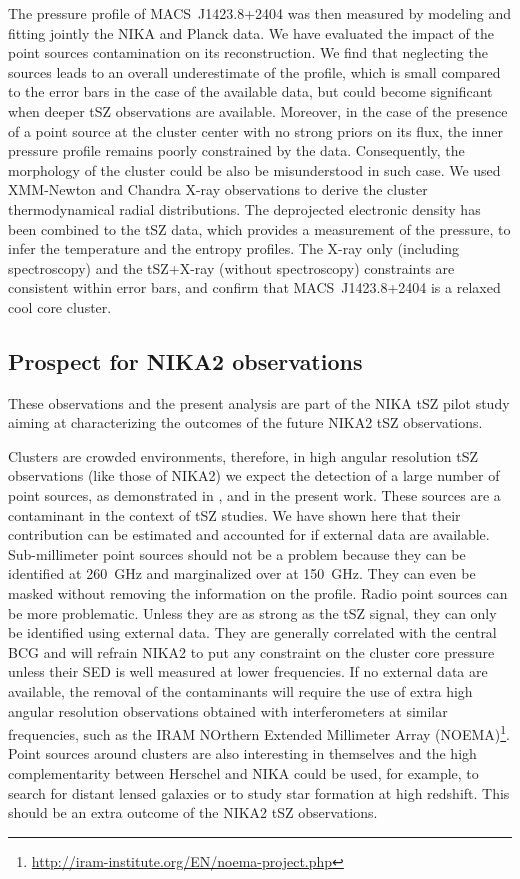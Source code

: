 \documentclass[twocolumn,traditabstract]{aa}
\begin{document}
The pressure profile of \mbox{MACS~J1423.8+2404} was then measured by modeling and fitting jointly the NIKA and Planck data. We have evaluated the impact of the point sources contamination on its reconstruction. We find that neglecting the sources leads to an overall underestimate of the profile, which is small compared to the error bars in the case of the available data, but could become significant when deeper tSZ observations are available. Moreover, in the case of the presence of a point source at the cluster center with no strong priors on its flux, the inner pressure profile remains poorly constrained by the data. Consequently, the morphology of the cluster could be also be misunderstood in such case. We used XMM-Newton and Chandra X-ray observations to derive the cluster thermodynamical radial distributions. The deprojected electronic density has been combined to the tSZ data, which provides a measurement of the pressure, to infer the temperature and the entropy profiles. The X-ray only (including spectroscopy) and the tSZ+X-ray (without spectroscopy) constraints are consistent within error bars, and confirm that \mbox{MACS~J1423.8+2404} is a relaxed cool core cluster.

\subsection{Prospect for NIKA2 observations}
These observations and the present analysis are part of the NIKA tSZ pilot study aiming at characterizing the outcomes of the future NIKA2 tSZ observations.

Clusters are crowded environments, therefore, in high angular resolution tSZ observations (like those of NIKA2) we expect the detection of a large number of point sources, as demonstrated in \cite{adam2013}, \cite{adam2014} and in the present work. These sources are a contaminant in the context of tSZ studies. We have shown here that their contribution can be estimated and accounted for if external data are available. Sub-millimeter point sources should not be a problem because they can be identified at 260~GHz and marginalized over at 150~GHz. They can even be masked without removing the information on the profile. Radio point sources can be more problematic. Unless they are as strong as the tSZ signal, they can only be identified using external data. They are generally correlated with the central BCG and will refrain NIKA2 to put any constraint on the cluster core pressure unless their SED is well measured at lower frequencies. If no external data are available, the removal of the contaminants will require the use of extra high angular resolution observations obtained with interferometers at similar frequencies, such as the IRAM NOrthern Extended Millimeter Array (NOEMA)\footnote{\url{http://iram-institute.org/EN/noema-project.php}}. Point sources around clusters are also interesting in themselves and the high complementarity between Herschel and NIKA could be used, for example, to search for distant lensed galaxies \citep[see for example][]{egami2010} or to study star formation at high redshift. This should be an extra outcome of the NIKA2 tSZ observations.
\end{document}
